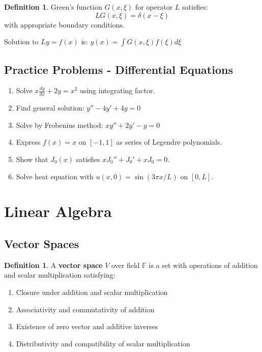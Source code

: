 \documentclass[12pt,a4paper]{article}
\theoremstyle{definition}
\newtheorem{definition}[theorem]{Definition}
\begin{document}
\begin{definition}
Green's function $G(x,\xi)$ for operator $L$ satisfies:
\[
LG(x,\xi) = \delta(x - \xi)
\]
with appropriate boundary conditions.

Solution to $Ly = f(x)$ is: $y(x) = \int G(x,\xi)f(\xi)d\xi$
\end{definition}

\subsection{Practice Problems - Differential Equations}

\begin{enumerate}
    \item Solve $x\frac{dy}{dx} + 2y = x^2$ using integrating factor.
    
    \item Find general solution: $y'' - 4y' + 4y = 0$
    
    \item Solve by Frobenius method: $xy'' + 2y' - y = 0$
    
    \item Express $f(x) = x$ on $[-1,1]$ as series of Legendre polynomials.
    
    \item Show that $J_0(x)$ satisfies $xJ_0'' + J_0' + xJ_0 = 0$.
    
    \item Solve heat equation with $u(x,0) = \sin(3\pi x/L)$ on $[0,L]$.
\end{enumerate}

\newpage
\section{Linear Algebra}

\subsection{Vector Spaces}

\begin{definition}
A \textbf{vector space} $V$ over field $\mathbb{F}$ is a set with operations of addition and scalar multiplication satisfying:
\begin{enumerate}
    \item Closure under addition and scalar multiplication
    \item Associativity and commutativity of addition
    \item Existence of zero vector and additive inverses
    \item Distributivity and compatibility of scalar multiplication
\end{enumerate}
\end{definition}
\end{document}
